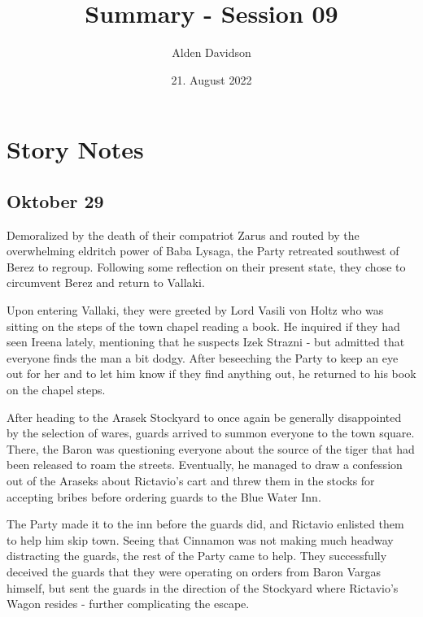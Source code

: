 \documentclass[a4paper,11pt]{article}
\title{Summary - Session 09}
\author{Alden Davidson}
\date{21. August 2022}
\begin{document}
\maketitle

\section{Story Notes}
\subsection{Oktober 29}
Demoralized by the death of their compatriot Zarus and routed by the overwhelming eldritch power of Baba Lysaga,
the Party retreated southwest of Berez to regroup. Following some reflection on their present state, they chose to 
circumvent Berez and return to Vallaki.

Upon entering Vallaki, they were greeted by Lord Vasili von Holtz who was sitting on the steps of the town chapel 
reading a book. He inquired if they had seen Ireena lately, mentioning that he suspects Izek Strazni - but admitted
that everyone finds the man a bit dodgy. After beseeching the Party to keep an eye out for her and to let him know
if they find anything out, he returned to his book on the chapel steps.

After heading to the Arasek Stockyard to once again be generally disappointed by the selection of wares, guards
arrived to summon everyone to the town square. There, the Baron was questioning everyone about the source of the
tiger that had been released to roam the streets. Eventually, he managed to draw a confession out of the Araseks
about Rictavio's cart and threw them in the stocks for accepting bribes before ordering guards to the Blue Water
Inn.

The Party made it to the inn before the guards did, and Rictavio enlisted them to help him skip town. Seeing that
Cinnamon was not making much headway distracting the guards, the rest of the Party came to help. They successfully
deceived the guards that they were operating on orders from Baron Vargas himself, but sent the guards in the 
direction of the Stockyard where Rictavio's Wagon resides - further complicating the escape.
\end{document}
